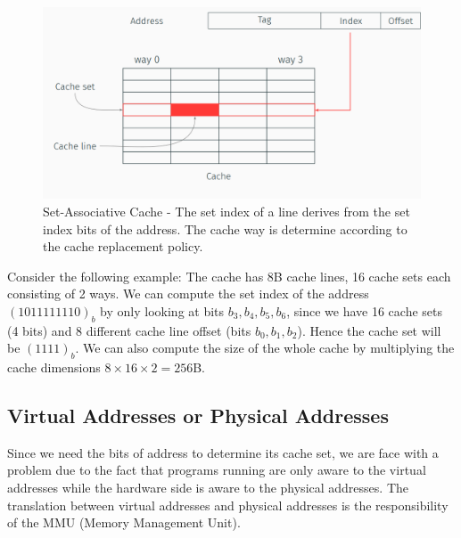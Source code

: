 \begin{figure}
    \centering
    \includegraphics[width=\textwidth]{images/chapter_6/SetWay.PNG}
    \caption{Set-Associative Cache - The set index of a line derives from the set index bits of the address. The cache way is determine according to the cache replacement policy.}
    \label{fig:SetWay}
\end{figure}

Consider the following example: The cache has 8B cache lines, 16 cache sets each
consisting of 2 ways. We can compute the set index of the address
$(1011111110)_b$ by only looking at bits $b_3, b_4, b_5, b_6$, since we have 16
cache sets (4 bits) and 8 different cache line offset (bits $b_0, b_1, b_2$).
Hence the cache set will be $(1111)_b$. We can also compute the size of the
whole cache by multiplying the cache dimensions $8 \times 16 \times 2 = 256 $B.

\subsection{Virtual Addresses or Physical Addresses}
\label{subsec:addrorphysicaladdr}
Since we need the bits of address to determine its cache set, we are face with a
problem due to the fact that programs running are only aware to the virtual
addresses while the hardware side is aware to the physical addresses. The
translation between virtual addresses and physical addresses is the
responsibility of the MMU (Memory Management Unit).

